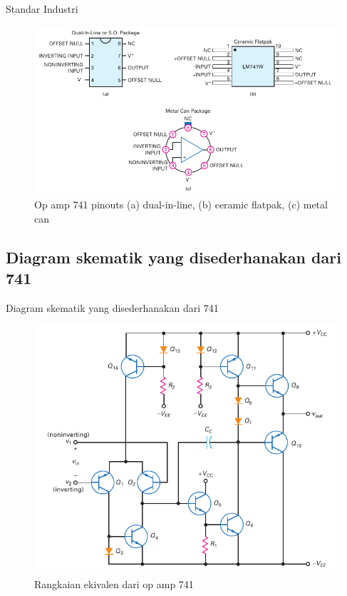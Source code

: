\begin{frame}{Standar Industri}
	\begin{figure}
		\centering
		\includegraphics[width=0.7\linewidth]{gambar/fig-16.03}
		\caption{Op amp 741 pinouts (a) dual-in-line, (b) ceramic flatpak, (c) metal can}
		\label{fig-16.03}
	\end{figure}
\end{frame}

\subsection{Diagram skematik yang disederhanakan dari 741}

\begin{frame}{Diagram skematik yang disederhanakan dari 741}
	\begin{figure}
		\centering
		\includegraphics[height=0.7\textheight]{gambar/fig-16.04}
		\caption{Rangkaian ekivalen dari op amp 741}
		\label{fig-16.04}
	\end{figure}
\end{frame}

